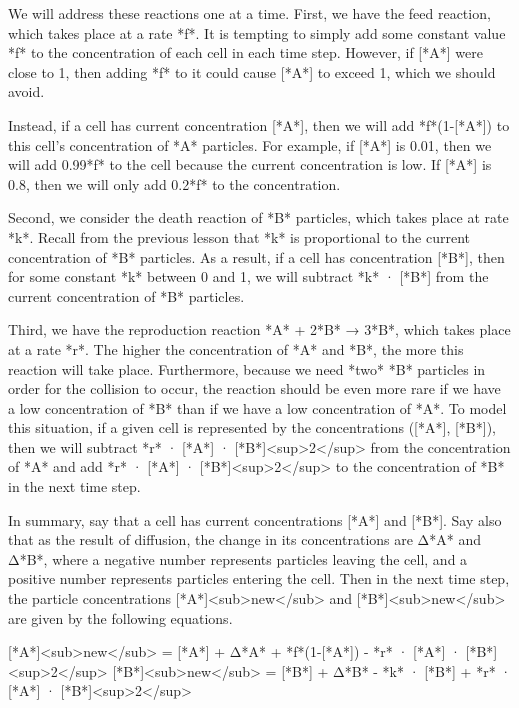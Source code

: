 {{{{{{{{{{\begin{qbox}\end{qbox}

We will address these reactions one at a time. First, we have the feed reaction, which takes place at a rate *f*. It is tempting to simply add some constant value *f* to the concentration of each cell in each time step. However, if [*A*] were close to 1, then adding *f* to it could cause [*A*] to exceed 1, which we should avoid.

Instead, if a cell has current concentration [*A*], then we will add *f*(1-[*A*]) to this cell's concentration of *A* particles. For example, if [*A*] is 0.01, then we will add 0.99*f* to the cell because the current concentration is low. If [*A*] is 0.8, then we will only add 0.2*f* to the concentration.

Second, we consider the death reaction of *B* particles, which takes place at rate *k*. Recall from the previous lesson that *k* is proportional to the current concentration of *B* particles. As a result, if a cell has concentration [*B*], then for some constant *k* between 0 and 1, we will subtract *k* · [*B*] from the current concentration of *B* particles.

Third, we have the reproduction reaction *A* + 2*B* → 3*B*, which takes place at a rate *r*. The higher the concentration of *A* and *B*, the more this reaction will take place. Furthermore, because we need *two* *B* particles in order for the collision to occur, the reaction should be even more rare if we have a low concentration of *B* than if we have a low concentration of *A*. To model this situation, if a given cell is represented by the concentrations ([*A*], [*B*]), then we will subtract *r* · [*A*] · [*B*]<sup>2</sup> from the concentration of *A* and add *r* · [*A*] · [*B*]<sup>2</sup> to the concentration of *B* in the next time step.

In summary, say that a cell has current concentrations [*A*] and [*B*]. Say also that as the result of diffusion, the change in its concentrations are Δ*A* and Δ*B*, where a negative number represents particles leaving the cell, and a positive number represents particles entering the cell. Then in the next time step, the particle concentrations [*A*]<sub>new</sub> and [*B*]<sub>new</sub> are given by the following equations.

[*A*]<sub>new</sub> = [*A*] + Δ*A* +  *f*(1-[*A*]) - *r* · [*A*] · [*B*]<sup>2</sup>
[*B*]<sub>new</sub> = [*B*] + Δ*B* - *k* · [*B*] + *r* · [*A*] · [*B*]<sup>2</sup>

}}}}}}}}}}

